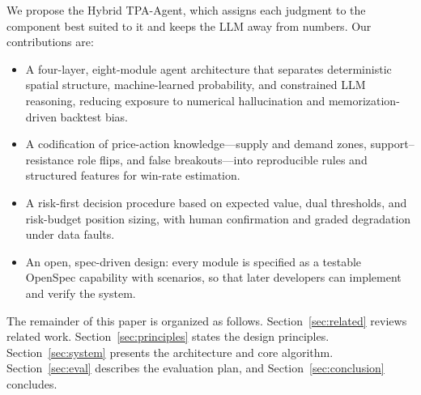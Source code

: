 \documentclass[conference]{IEEEtran}
\begin{document}
We propose the Hybrid TPA-Agent, which assigns each judgment to the component best suited to it and keeps the LLM away from numbers. Our contributions are:
\begin{itemize}
\item A four-layer, eight-module agent architecture that separates deterministic spatial structure, machine-learned probability, and constrained LLM reasoning, reducing exposure to numerical hallucination and memorization-driven backtest bias.
\item A codification of price-action knowledge---supply and demand zones, support--resistance role flips, and false breakouts---into reproducible rules and structured features for win-rate estimation.
\item A risk-first decision procedure based on expected value, dual thresholds, and risk-budget position sizing, with human confirmation and graded degradation under data faults.
\item An open, spec-driven design: every module is specified as a testable OpenSpec capability with scenarios, so that later developers can implement and verify the system.
\end{itemize}

The remainder of this paper is organized as follows. Section~\ref{sec:related} reviews related work. Section~\ref{sec:principles} states the design principles. Section~\ref{sec:system} presents the architecture and core algorithm. Section~\ref{sec:eval} describes the evaluation plan, and Section~\ref{sec:conclusion} concludes.
\end{document}
